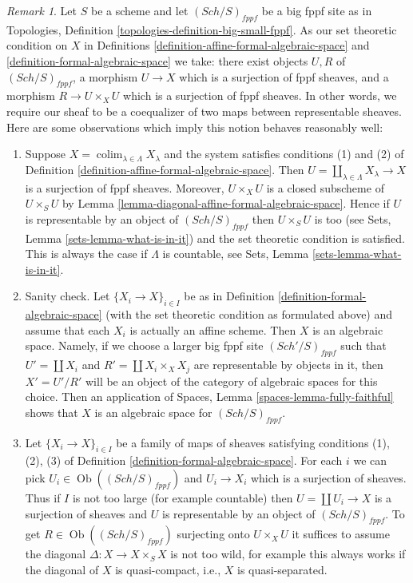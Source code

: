 \documentclass{stacks-project}
\theoremstyle{plain}
\theoremstyle{definition}
\theoremstyle{remark}
\newtheorem{remark}[subsection]{Remark}
\numberwithin{equation}{subsection}
\def\colim{\mathop{\mathrm{colim}}\nolimits}
\def\Sch{\mathit{Sch}}
\def\Ob{\mathop{\mathrm{Ob}}\nolimits}
\begin{document}
\begin{remark}
\label{remark-set-theoretic}
Let $S$ be a scheme and let $(\Sch/S)_{fppf}$ be a big fppf site as
in Topologies, Definition \ref{topologies-definition-big-small-fppf}.
As our set theoretic condition on $X$ in
Definitions \ref{definition-affine-formal-algebraic-space} and
\ref{definition-formal-algebraic-space} we take:
there exist objects $U, R$ of $(\Sch/S)_{fppf}$, a
morphism $U \to X$ which is a surjection of fppf sheaves, and
a morphism $R \to U \times_X U$ which is a surjection of fppf sheaves.
In other words, we require our sheaf to be a coequalizer of
two maps between representable sheaves.
Here are some observations which imply this notion behaves
reasonably well:
\begin{enumerate}
\item Suppose $X = \colim_{\lambda \in \Lambda} X_\lambda$
and the system satisfies conditions (1) and (2) of
Definition \ref{definition-affine-formal-algebraic-space}. Then
$U = \coprod_{\lambda \in \Lambda} X_\lambda \to X$ is a surjection
of fppf sheaves. Moreover, $U \times_X U$ is a closed subscheme
of $U \times_S U$ by Lemma \ref{lemma-diagonal-affine-formal-algebraic-space}.
Hence if $U$ is representable by an object of $(\Sch/S)_{fppf}$
then $U \times_S U$ is too (see Sets, Lemma \ref{sets-lemma-what-is-in-it})
and the set theoretic condition is satisfied. This is always the case
if $\Lambda$ is countable, see Sets, Lemma \ref{sets-lemma-what-is-in-it}.
\item Sanity check. Let $\{X_i \to X\}_{i \in I}$ be as in
Definition \ref{definition-formal-algebraic-space}
(with the set theoretic condition as formulated above)
and assume that each $X_i$ is actually an affine scheme.
Then $X$ is an algebraic space. Namely, if we choose a larger
big fppf site $(\Sch'/S)_{fppf}$ such that $U' = \coprod X_i$
and $R' = \coprod X_i \times_X X_j$ are representable by objects
in it, then $X' = U'/R'$ will be an object of the category
of algebraic spaces for this choice. Then an application of
Spaces, Lemma \ref{spaces-lemma-fully-faithful} shows that
$X$ is an algebraic space for $(\Sch/S)_{fppf}$.
\item Let $\{X_i \to X\}_{i \in I}$ be a family of maps of sheaves
satisfying conditions (1), (2), (3) of
Definition \ref{definition-formal-algebraic-space}.
For each $i$ we can pick $U_i \in \Ob((\Sch/S)_{fppf})$
and $U_i \to X_i$ which is a surjection of sheaves.
Thus if $I$ is not too large (for example countable) then
$U = \coprod U_i \to X$ is a surjection of sheaves and
$U$ is representable by an object of $(\Sch/S)_{fppf}$.
To get $R \in \Ob((\Sch/S)_{fppf})$ surjecting onto $U \times_X U$
it suffices to assume the diagonal $\Delta : X \to X \times_S X$ is not
too wild, for example this always works if the diagonal of $X$ is
quasi-compact, i.e., $X$ is quasi-separated.
\end{enumerate}
\end{remark}
\end{document}
